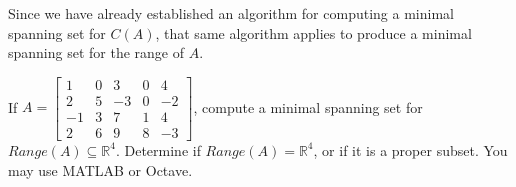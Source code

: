 \documentclass{ximera}
\begin{document}
Since we have already established an algorithm for computing a minimal spanning set for $C(A)$, that same algorithm applies to produce a minimal spanning set for the range of $A$.

\begin{exercise}
If  $A = \begin{bmatrix}
1 & 0 & 3 & 0 & 4\\
2 & 5 & -3 & 0 & -2\\
-1 & 3 & 7 & 1 & 4\\
2 & 6 & 9 & 8 & -3
\end{bmatrix}$, compute a minimal spanning set for $Range(A)\subseteq \mathbb R^4$. Determine if $Range(A) = \mathbb R^4$, or if it is a proper subset. You may use MATLAB or Octave.
\end{exercise}
\end{document}
